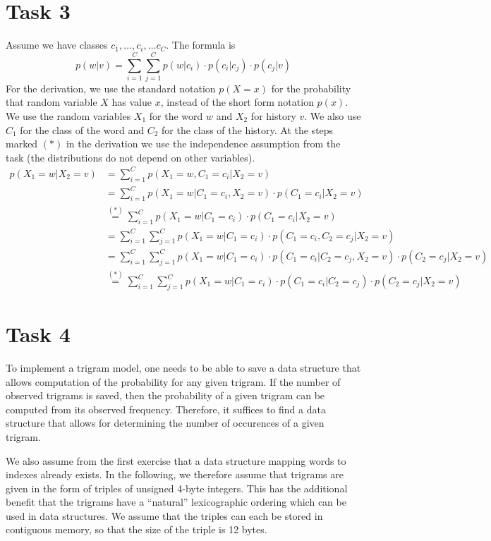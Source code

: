 \documentclass[%
   11pt,              %
   ngerman,           %
   a4paper,           %
   DIV11,             %
]{scrartcl}%
\begin{document}
\section*{Task 3}
Assume we have classes $c_1,\ldots,c_i,\ldots c_C$.
The formula is 
\begin{equation*}
	p(w|v) = \sum_{i=1}^C \sum_{j=1}^C p(w|c_i) \cdot p(c_i|c_j) \cdot p(c_j|v)
\end{equation*}
For the derivation, we use the standard notation $p(X=x)$ for the probability that random variable $X$ has value $x$, instead of the short form notation $p(x)$. We use the random variables $X_1$ for the word $w$ and $X_2$ for history $v$. We also use $C_1$ for the class of the word and $C_2$ for the class of the history. At the steps marked $(*)$ in the derivation we use the independence assumption from the task (the distributions do not depend on other variables).
\begin{align*}
	p(X_1 = w | X_2 = v) &= \sum_{i=1}^C p(X_1 = w, C_1 = c_i | X_2 = v) \\
	&= \sum_{i=1}^C p(X_1 = w|C_1 = c_i, X_2 = v) \cdot p(C_1 = c_i| X_2 = v) \\
	&\overset{(*)}{=} \sum_{i=1}^C p(X_1 = w|C_1 = c_i) \cdot p(C_1 = c_i| X_2 = v) \\
	&= \sum_{i=1}^C \sum_{j=1}^C p(X_1 = w|C_1 = c_i) \cdot p(C_1 = c_i, C_2 = c_j| X_2 = v) \\
	&= \sum_{i=1}^C \sum_{j=1}^C p(X_1 = w|C_1 = c_i) \cdot p(C_1 = c_i| C_2 = c_j, X_2 = v) \cdot p(C_2 = c_j | X_2 = v) \\
	&\overset{(*)}{=} \sum_{i=1}^C \sum_{j=1}^C p(X_1 = w|C_1 = c_i) \cdot p(C_1 = c_i| C_2 = c_j) \cdot p(C_2 = c_j | X_2 = v)
\end{align*}
\section*{Task 4}
To implement a trigram model, one needs to be able to save a data structure that allows computation of the probability for any given trigram. If the number of observed trigrams is saved, then the probability of a given trigram can be computed from its observed frequency. Therefore, it suffices to find a data structure that allows for determining the number of occurences of a given trigram.

We also assume from the first exercise that a data structure mapping words to indexes already exists. In the following, we therefore assume that trigrams are given in the form of triples of unsigned 4-byte integers. This has the additional benefit that the trigrams have a ``natural'' lexicographic ordering which can be used in data structures. We assume that the triples can each be stored in contiguous memory, so that the size of the triple is 12 bytes.
\end{document}

